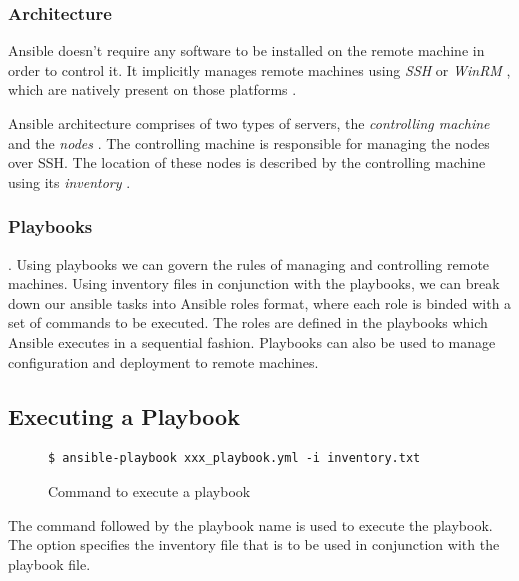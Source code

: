 \documentclass[9pt,twocolumn,twoside]{../../styles/osajnl}
\begin{document}
\subsubsection{Architecture}
Ansible doesn't require any software to be installed on the remote
machine in order to control it. It implicitly manages remote machines
using \emph{SSH} \cite{www-ssh} or \emph{WinRM}
\cite{www-winrm-microsoft}, which are natively present on those
platforms \cite{www-ansible-architecture}.

\noindent
Ansible architecture comprises of two types of servers, the
\emph{controlling machine} and the \emph{nodes}
\cite{www-wiki-ansible}. The controlling machine is responsible for
managing the nodes over SSH. The location of these nodes is described
by the controlling machine using its \emph{inventory}
\cite{www-ansible-inventory}.


\subsubsection{Playbooks}

\cite{www-ansible-playbook}. Using playbooks we can govern the rules
of managing and controlling remote machines. Using inventory files in
conjunction with the playbooks, we can break down our ansible tasks
into Ansible roles format, where each role is binded with a set of
commands to be executed. The roles are defined in the playbooks which
Ansible executes in a sequential fashion. Playbooks can also be used
to manage configuration and deployment to remote machines.

\subsection{Executing a Playbook}
\begin{figure}[H]
\begin{verbatim}
$ ansible-playbook xxx_playbook.yml -i inventory.txt
\end{verbatim}
\caption{Command to execute a playbook}
\vspace{-4mm}
\label{Command to execute a playbook}
\end{figure}

\noindent
The  command followed by the playbook name is
used to execute the playbook.  The  option specifies the
inventory file that is to be used in conjunction with the playbook
file.
\end{document}
